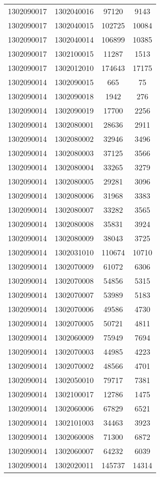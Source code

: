 \begin{longtable}{llcc}
1302090017 & 1302040016 & 97120 & 9143\\
1302090017 & 1302040015 & 102725 & 10084\\
1302090017 & 1302040014 & 106899 & 10385\\
1302090017 & 1302100015 & 11287 & 1513\\
1302090017 & 1302012010 & 174643 & 17175\\
1302090014 & 1302090015 & 665 & 75\\
1302090014 & 1302090018 & 1942 & 276\\
1302090014 & 1302090019 & 17700 & 2256\\
1302090014 & 1302080001 & 28636 & 2911\\
1302090014 & 1302080002 & 32946 & 3496\\
1302090014 & 1302080003 & 37125 & 3566\\
1302090014 & 1302080004 & 33265 & 3279\\
1302090014 & 1302080005 & 29281 & 3096\\
1302090014 & 1302080006 & 31968 & 3383\\
1302090014 & 1302080007 & 33282 & 3565\\
1302090014 & 1302080008 & 35831 & 3924\\
1302090014 & 1302080009 & 38043 & 3725\\
1302090014 & 1302031010 & 110674 & 10710\\
1302090014 & 1302070009 & 61072 & 6306\\
1302090014 & 1302070008 & 54856 & 5315\\
1302090014 & 1302070007 & 53989 & 5183\\
1302090014 & 1302070006 & 49586 & 4730\\
1302090014 & 1302070005 & 50721 & 4811\\
1302090014 & 1302060009 & 75949 & 7694\\
1302090014 & 1302070003 & 44985 & 4223\\
1302090014 & 1302070002 & 48566 & 4701\\
1302090014 & 1302050010 & 79717 & 7381\\
1302090014 & 1302100017 & 12786 & 1475\\
1302090014 & 1302060006 & 67829 & 6521\\
1302090014 & 1302101003 & 34463 & 3923\\
1302090014 & 1302060008 & 71300 & 6872\\
1302090014 & 1302060007 & 64232 & 6039\\
1302090014 & 1302020011 & 145737 & 14314\\

\end{longtable}
